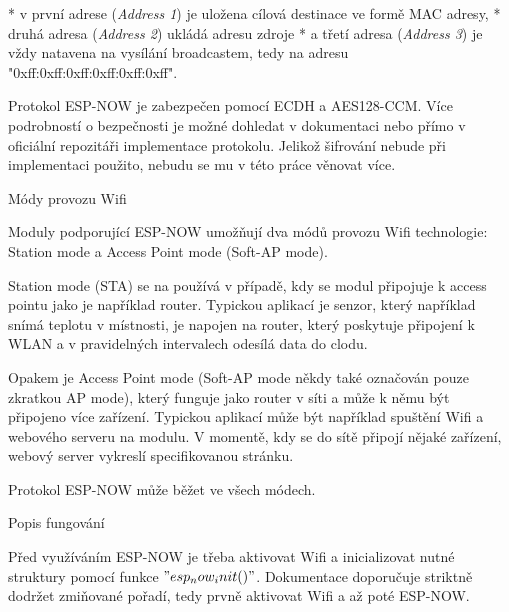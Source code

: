 \begitems
* v první adrese ({\em Address 1}) je uložena cílová destinace ve formě MAC adresy,
* druhá adresa ({\em Address 2}) ukládá adresu zdroje
* a třetí adresa ({\em Address 3}) je vždy natavena na vysílání broadcastem, tedy na adresu "0xff:0xff:0xff:0xff:0xff:0xff".
\enditems

Protokol ESP-NOW je zabezpečen pomocí ECDH a AES128-CCM. Více podrobností o bezpečnosti je možné dohledat v dokumentaci  nebo přímo v oficiální repozitáři implementace protokolu. Jelikož šifrování nebude při implementaci použito, nebudu se mu v této práce věnovat více.

\secc Módy provozu Wifi

Moduly podporující ESP-NOW umožňují dva módů provozu Wifi technologie: Station mode a Access Point mode (Soft-AP mode).

{\sbf Station mode} (STA) se na používá v případě, kdy se modul připojuje k access pointu jako je například router. Typickou aplikací je senzor, který například snímá teplotu v místnosti, je napojen na router, který poskytuje připojení k WLAN a v pravidelných intervalech odesílá data do clodu.

Opakem je {\sbf Access Point mode} (Soft-AP mode někdy také označován pouze zkratkou AP mode), který funguje jako router v síti a může k němu být připojeno více zařízení. Typickou aplikací může být například spuštění Wifi a webového serveru na modulu. V momentě, kdy se do sítě připojí nějaké zařízení, webový server vykreslí specifikovanou stránku.

Protokol ESP-NOW může běžet ve všech módech.

\secc Popis fungování

Před využíváním ESP-NOW je třeba aktivovat Wifi a {\sbf inicializovat} nutné struktury pomocí funkce $"esp_now_init()"$. Dokumentace doporučuje striktně dodržet zmiňované pořadí, tedy prvně aktivovat Wifi a až poté ESP-NOW.

